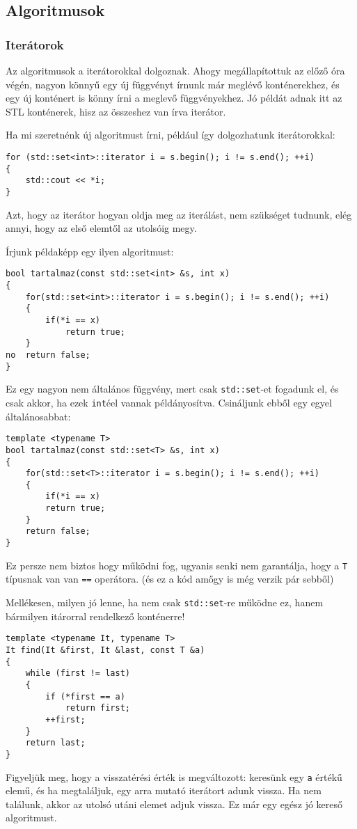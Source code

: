 \documentclass[a4paper,11.5pt]{article}
\begin{document}
	\subsection{Algoritmusok}
	\subsubsection{Iterátorok}
	Az algoritmusok a iterátorokkal dolgoznak. Ahogy megállapítottuk az előző óra végén, nagyon könnyű egy új függvényt írnunk már meglévő konténerekhez, és egy új konténert is könny írni a meglevő függvényekhez. Jó példát adnak itt az STL konténerek, hisz az összeshez van írva iterátor.
	
	Ha mi szeretnénk új algoritmust írni, például így dolgozhatunk iterátorokkal:
	\begin{lstlisting}
for (std::set<int>::iterator i = s.begin(); i != s.end(); ++i)
{
	std::cout << *i;
}
	\end{lstlisting}
	Azt, hogy az iterátor hogyan oldja meg az iterálást, nem szükséget tudnunk, elég annyi, hogy az első elemtől az utolsóig megy.
	
	\smallskip
	Írjunk példaképp egy ilyen algoritmust:
	\begin{lstlisting}
bool tartalmaz(const std::set<int> &s, int x)
{
	for(std::set<int>::iterator i = s.begin(); i != s.end(); ++i)
	{
		if(*i == x)
			return true;
	}
no	return false;
}
	\end{lstlisting}
	
	Ez egy nagyon nem általános függvény, mert csak \texttt{std::set}-et fogadunk el, és csak akkor, ha ezek \texttt{int}éel vannak példányosítva. Csináljunk ebből egy egyel általánosabbat:
\begin{lstlisting}
template <typename T>
bool tartalmaz(const std::set<T> &s, int x)
{
	for(std::set<T>::iterator i = s.begin(); i != s.end(); ++i)
	{
		if(*i == x)
		return true;
	}
	return false;
}
\end{lstlisting}
	Ez persze nem biztos hogy működni fog, ugyanis senki nem garantálja, hogy a \texttt{T} típusnak van van \texttt{==} operátora. (és ez a kód amőgy is még verzik pár sebből)
	
	\medskip
	Mellékesen, milyen jó lenne, ha nem csak \texttt{std::set}-re működne ez, hanem bármilyen itárorral rendelkező konténerre!
\begin{lstlisting}
template <typename It, typename T>
It find(It &first, It &last, const T &a)
{
	while (first != last)
	{
		if (*first == a)
			return first;
		++first;
	}
	return last;
}
\end{lstlisting}
	Figyeljük meg, hogy a visszatérési érték is megváltozott: keresünk egy \texttt{a} értékű elemű, és ha megtaláljuk, egy arra mutató iterátort adunk vissza. Ha nem találunk, akkor az utolsó utáni elemet adjuk vissza. Ez már egy egész jó kereső algoritmust.
	
\end{document}
